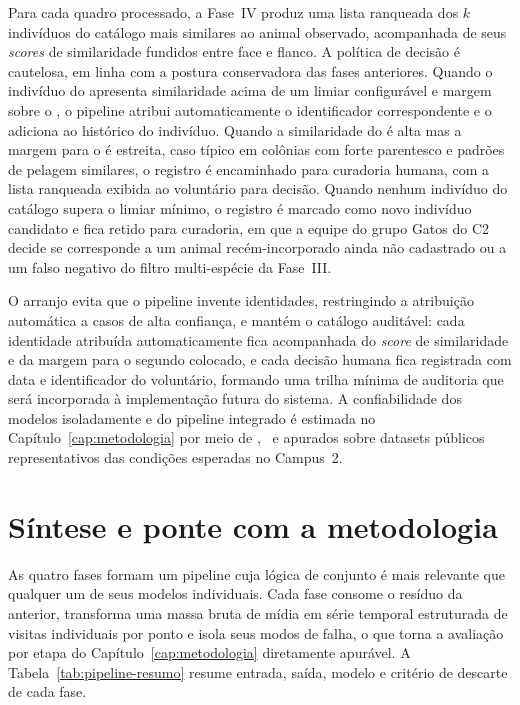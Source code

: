 Para cada quadro processado, a Fase~IV produz uma lista ranqueada dos $k$ indivíduos do catálogo mais similares ao animal observado, acompanhada de seus \textit{scores} de similaridade fundidos entre face e flanco. A política de decisão é cautelosa, em linha com a postura conservadora das fases anteriores. Quando o indivíduo do  apresenta similaridade acima de um limiar configurável e margem sobre o , o pipeline atribui automaticamente o identificador correspondente e o adiciona ao histórico do indivíduo. Quando a similaridade do  é alta mas a margem para o  é estreita, caso típico em colônias com forte parentesco e padrões de pelagem similares, o registro é encaminhado para curadoria humana, com a lista ranqueada exibida ao voluntário para decisão. Quando nenhum indivíduo do catálogo supera o limiar mínimo, o registro é marcado como novo indivíduo candidato e fica retido para curadoria, em que a equipe do grupo Gatos do C2 decide se corresponde a um animal recém-incorporado ainda não cadastrado ou a um falso negativo do filtro multi-espécie da Fase~III.

O arranjo evita que o pipeline invente identidades, restringindo a atribuição automática a casos de alta confiança, e mantém o catálogo auditável: cada identidade atribuída automaticamente fica acompanhada do \textit{score} de similaridade e da margem para o segundo colocado, e cada decisão humana fica registrada com data e identificador do voluntário, formando uma trilha mínima de auditoria que será incorporada à implementação futura do sistema. A confiabilidade dos modelos isoladamente e do pipeline integrado é estimada no Capítulo~\ref{cap:metodologia} por meio de \mAP, \Fscore\ e  apurados sobre datasets públicos representativos das condições esperadas no Campus~2.

\section{Síntese e ponte com a metodologia}
\label{sec:pipeline-sintese}

As quatro fases formam um pipeline cuja lógica de conjunto é mais relevante que qualquer um de seus modelos individuais. Cada fase consome o resíduo da anterior, transforma uma massa bruta de mídia em série temporal estruturada de visitas individuais por ponto e isola seus modos de falha, o que torna a avaliação por etapa do Capítulo~\ref{cap:metodologia} diretamente apurável. A Tabela~\ref{tab:pipeline-resumo} resume entrada, saída, modelo e critério de descarte de cada fase.

